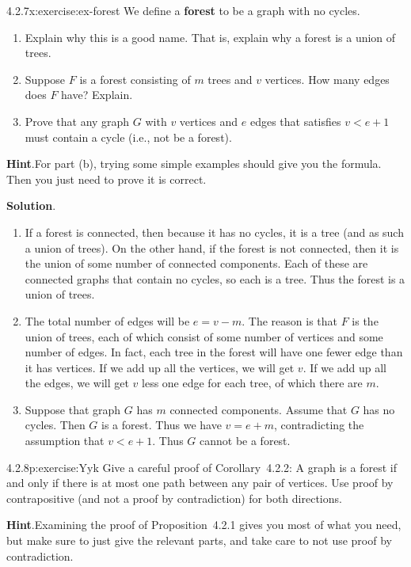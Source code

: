 \documentclass[twoside,11pt,]{book}
\newcommand{\blocktitlefont}{\relax}
\newcommand{\terminology}[1]{\textbf{#1}}
\numberwithin{equation}{chapter}
\newcommand{\lt}{<}
\begin{document}
\begin{divisionsolution}{4.2.7}{}{x:exercise:ex-forest}%
We define a \terminology{forest} to be a graph with no cycles.%
\begin{enumerate}[label=(\alph*)]
\item{}Explain why this is a good name. That is, explain why a forest is a union of trees.%
\item{}Suppose \(F\) is a forest consisting of \(m\) trees and \(v\) vertices. How many edges does \(F\) have? Explain.%
\item{}Prove that any graph \(G\) with \(v\) vertices and \(e\) edges that satisfies \(v \lt e+1\) must contain a cycle (i.e., not be a forest).%
\end{enumerate}
%
\par\smallskip%
\noindent\textbf{\blocktitlefont Hint}.\quad{}For part (b), trying some simple examples should give you the formula.  Then you just need to prove it is correct.%
\par\smallskip%
\noindent\textbf{\blocktitlefont Solution}.\quad{}%
\begin{enumerate}[label=(\alph*)]
\item{}If a forest is connected, then because it has no cycles, it is a tree (and as such a union of trees). On the other hand, if the forest is not connected, then it is the union of some number of connected components. Each of these are connected graphs that contain no cycles, so each is a tree. Thus the forest is a union of trees.%
\item{}The total number of edges will be \(e = v - m\). The reason is that \(F\) is the union of trees, each of which consist of some number of vertices and some number of edges. In fact, each tree in the forest will have one fewer edge than it has vertices. If we add up all the vertices, we will get \(v\). If we add up all the edges, we will get \(v\) less one edge for each tree, of which there are \(m\).%
\item{}Suppose that graph \(G\) has \(m\) connected components. Assume that \(G\) has no cycles. Then \(G\) is a forest. Thus we have \(v = e+m\), contradicting the assumption that \(v \lt e+1\). Thus \(G\) cannot be a forest.%
\end{enumerate}
%
\end{divisionsolution}%
\begin{divisionsolution}{4.2.8}{}{p:exercise:Yyk}%
Give a careful proof of Corollary~4.2.2: A graph is a forest if and only if there is at most one path between any pair of vertices.  Use proof by contrapositive (and not a proof by contradiction) for both directions.%
\par\smallskip%
\noindent\textbf{\blocktitlefont Hint}.\quad{}Examining the proof of Proposition~4.2.1 gives you most of what you need, but make sure to just give the relevant parts, and take care to not use proof by contradiction.%
\end{divisionsolution}%
\end{document}
